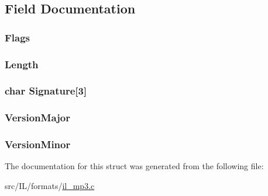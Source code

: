 \subsection{Field Documentation}
\hypertarget{struct_m_p3_h_e_a_d_a4d4e57f611ec63d5199ee6ea1c56077e}{
\subsubsection[{Flags}]{ Flags}}\label{struct_m_p3_h_e_a_d_a4d4e57f611ec63d5199ee6ea1c56077e}
\hypertarget{struct_m_p3_h_e_a_d_a3ed5d34564fb19b1d2884d37b6143e6a}{
\subsubsection[{Length}]{ Length}}\label{struct_m_p3_h_e_a_d_a3ed5d34564fb19b1d2884d37b6143e6a}
\hypertarget{struct_m_p3_h_e_a_d_a2c30715aae62a2021a31a25528482eb8}{
\subsubsection[{Signature}]{\setlength{\rightskip}{0pt plus 5cm}char Signature\mbox{[}3\mbox{]}}}\label{struct_m_p3_h_e_a_d_a2c30715aae62a2021a31a25528482eb8}
\hypertarget{struct_m_p3_h_e_a_d_a09c1cb5a9a8550d5971986d9464355fd}{
\subsubsection[{Version\-Major}]{ Version\-Major}}\label{struct_m_p3_h_e_a_d_a09c1cb5a9a8550d5971986d9464355fd}
\hypertarget{struct_m_p3_h_e_a_d_a3b5c207ac380f188549f369420f68cfe}{
\subsubsection[{Version\-Minor}]{ Version\-Minor}}\label{struct_m_p3_h_e_a_d_a3b5c207ac380f188549f369420f68cfe}


The documentation for this struct was generated from the following file\-:\begin{DoxyCompactItemize}
\item 
src/\-I\-L/formats/\hyperlink{il__mp3_8c}{il\-\_\-mp3.\-c}\end{DoxyCompactItemize}
